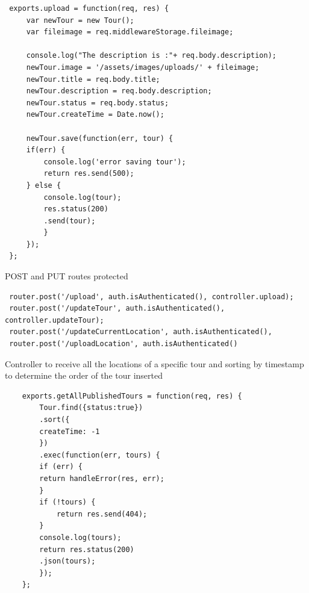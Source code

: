 	   \begin{verbatim}
 exports.upload = function(req, res) {
	 var newTour = new Tour();
	 var fileimage = req.middlewareStorage.fileimage;
	 
	 console.log("The description is :"+ req.body.description);
	 newTour.image = '/assets/images/uploads/' + fileimage;
	 newTour.title = req.body.title;
	 newTour.description = req.body.description;
	 newTour.status = req.body.status;
	 newTour.createTime = Date.now();
	 
	 newTour.save(function(err, tour) {
	 if(err) {
		 console.log('error saving tour');
		 return res.send(500);
	 } else {
		 console.log(tour);
		 res.status(200)
		 .send(tour);
		 }
	 });
 };
	   \end{verbatim}
 POST and PUT routes protected
 
 \begin{verbatim}
 router.post('/upload', auth.isAuthenticated(), controller.upload);
 router.post('/updateTour', auth.isAuthenticated(), controller.updateTour);
 router.post('/updateCurrentLocation', auth.isAuthenticated(), 
 router.post('/uploadLocation', auth.isAuthenticated()
 \end{verbatim}
	
Controller to receive all the locations of a specific tour and sorting by timestamp to determine the order of the tour inserted

\begin{verbatim}
	exports.getAllPublishedTours = function(req, res) {
		Tour.find({status:true})
		.sort({
		createTime: -1
		})
		.exec(function(err, tours) {
		if (err) {
		return handleError(res, err);
		}
		if (!tours) {
			return res.send(404);
		}
		console.log(tours);
		return res.status(200)
		.json(tours);
		});
	};
\end{verbatim}
